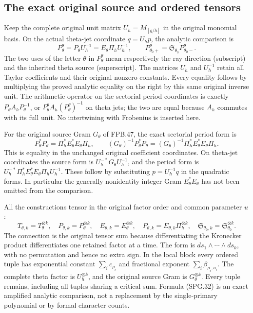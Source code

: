 \subsection{The exact original source and ordered tensors}

Keep the complete original unit matrix \(U_h=M_{[g/h]}\) in the
original monomial basis. On the actual theta-jet coordinate
\(q=U_hp\), the analytic comparison is
\[
 P_\theta^\theta=P_\theta U_h^{-1}
       =E_\theta\Pi_h U_h^{-1},
 \qquad
 P_{\theta_0+}^\theta
       =\mathfrak S_{\theta_0}P_{\theta_0-}^\theta.
 \tag{SPG.30}\label{eq:spg-theta}
\]
The two uses of the letter \(\theta\) in \(P_\theta^\theta\)
mean respectively the ray direction (subscript) and the inherited
theta source (superscript). The matrices \(U_h\) and \(U_h^{-1}\)
retain all Taylor coefficients and their original nonzero constants.
Every equality follows by multiplying the proved analytic equality
on the right by this same original inverse unit. The arithmetic
operator on the sectorial period coordinates is exactly
\(P_\theta A_h P_\theta^{-1}\), or
\(P_\theta^\theta A_h(P_\theta^\theta)^{-1}\) on theta jets;
the two are equal because \(A_h\) commutes with its full unit.
No intertwining with Frobenius is inserted here.

For the original source Gram \(G_\theta\) of FPB.47, the exact
sectorial period form is
\[
 P_\theta^*P_\theta
      =\Pi_h^* E_\theta^*E_\theta\Pi_h,
 \qquad
 (G_\theta)^{-1}P_\theta^*P_\theta
      =(G_\theta)^{-1}\Pi_h^*E_\theta^*E_\theta\Pi_h.
 \tag{SPG.31}\label{eq:spg-metric}
\]
This is equality in the unchanged original coefficient coordinates.
On theta-jet coordinates the source form is
\(U_h^{-*}G_\theta U_h^{-1}\), and the period form is
\(U_h^{-*}\Pi_h^*E_\theta^*E_\theta\Pi_hU_h^{-1}\).
These follow by substituting \(p=U_h^{-1}q\) in the quadratic
forms. In particular the generally nonidentity integer Gram
\(E_\theta^*E_\theta\) has not been omitted from the comparison.

All the constructions tensor in the original factor order and common
parameter \(u\):
\[
 T_{\theta,k}=T_\theta^{\otimes k},\quad
 P_{\theta,k}=P_\theta^{\otimes k},\quad
 E_{\theta,k}=E_\theta^{\otimes k},\quad
 P_{\theta,k}=E_{\theta,k}\Pi_h^{\otimes k},\quad
 \mathfrak S_{\theta_0,k}=\mathfrak S_{\theta_0}^{\otimes k}.
 \tag{SPG.32}\label{eq:spg-tensor}
\]
The connection is the original tensor sum because differentiating
the Kronecker product differentiates one retained factor at a time.
The form is \(ds_1\wedge\cdots\wedge ds_k\), with no
permutation and hence no extra sign. In the local block every
ordered tuple has exponential constant \(\sum_i c_{\rho_i}\)
and fractional exponent \(\sum_i\beta_{\rho_i,a_i}\). The
complete theta factor is \(U_h^{\otimes k}\), and the original
source Gram is \(G_\theta^{\otimes k}\). Every tuple remains,
including all tuples sharing a critical sum. Formula (SPG.32) is an
exact amplified analytic comparison, not a replacement by the
single-primary polynomial or by formal character counts.

